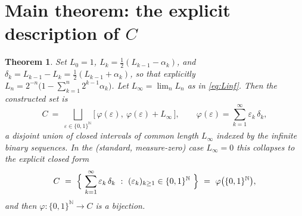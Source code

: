 \documentclass{amsart}
\newtheorem{theorem}{Theorem}
\theoremstyle{definition}
\theoremstyle{remark}
\begin{document}
\section{Main theorem: the explicit description of $C$}

\begin{theorem}\label{thm:main}
Set $L_0=1$, $L_k=\tfrac12(L_{k-1}-\alpha_k)$, and
$\delta_k=L_{k-1}-L_k=\tfrac12(L_{k-1}+\alpha_k)$, so that explicitly
$L_n=2^{-n}\bigl(1-\sum_{k=1}^{n}2^{k-1}\alpha_k\bigr)$. Let $L_\infty=\lim_n L_n$
as in \eqref{eq:Linf}. Then the constructed set is
\begin{equation}\label{eq:general}
\boxed{\,C\ =\ \bigsqcup_{\varepsilon\in\{0,1\}^{\mathbb N}}
\bigl[\,\varphi(\varepsilon),\ \varphi(\varepsilon)+L_\infty\,\bigr],
\qquad
\varphi(\varepsilon)=\sum_{k=1}^{\infty}\varepsilon_k\,\delta_k,\,}
\end{equation}
a disjoint union of closed intervals of common length $L_\infty$ indexed by the
infinite binary sequences. In the (standard, measure-zero) case $L_\infty=0$ this
collapses to the explicit closed form
\begin{equation}\label{eq:main}
C\ =\ \Bigl\{\ \sum_{k=1}^{\infty}\varepsilon_k\,\delta_k\ :\
(\varepsilon_k)_{k\ge1}\in\{0,1\}^{\mathbb N}\ \Bigr\}
\ =\ \varphi\bigl(\{0,1\}^{\mathbb N}\bigr),
\end{equation}
and then $\varphi:\{0,1\}^{\mathbb N}\to C$ is a bijection.
\end{theorem}
\end{document}
